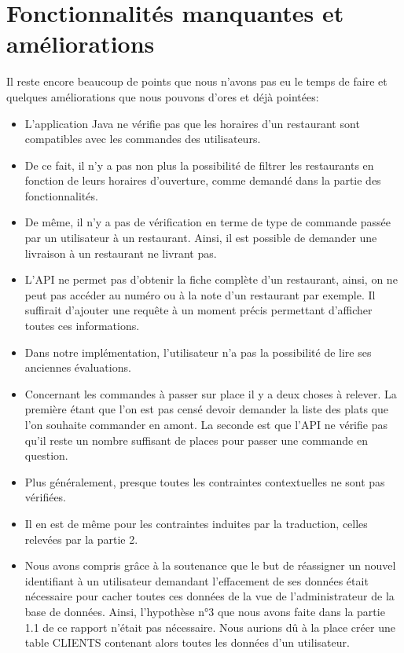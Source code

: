 \documentclass[10pt, a4paper]{article}
\begin{document}
\section{Fonctionnalités manquantes et améliorations}

Il reste encore beaucoup de points que nous n'avons pas eu le temps de faire et quelques améliorations que nous pouvons d'ores et déjà pointées:

\begin{itemize}
    \item L'application Java ne vérifie pas que les horaires d'un restaurant sont compatibles avec les commandes des utilisateurs.
    \item De ce fait, il n'y a pas non plus la possibilité de filtrer les restaurants en fonction de leurs horaires d'ouverture, comme demandé dans la partie des fonctionnalités.
    \item De même, il n'y a pas de vérification en terme de type de commande passée par un utilisateur à un restaurant. Ainsi, il est possible de demander une livraison à un restaurant ne livrant pas.
    \item L'API ne permet pas d'obtenir la fiche complète d'un restaurant, ainsi, on ne peut pas accéder au numéro ou à la note d'un restaurant par exemple. Il suffirait d'ajouter une requête à un moment précis permettant d'afficher toutes ces informations.
    \item Dans notre implémentation, l'utilisateur n'a pas la possibilité de lire ses anciennes évaluations.
    \item Concernant les commandes à passer sur place il y a deux choses à relever. La première étant que l'on est pas censé devoir demander la liste des plats que l'on souhaite commander en amont. La seconde est que l'API ne vérifie pas qu'il reste un nombre suffisant de places pour passer une commande en question.
    \item Plus généralement, presque toutes les contraintes contextuelles ne sont pas vérifiées.
    \item Il en est de même pour les contraintes induites par la traduction, celles relevées par la partie 2.
    \item Nous avons compris grâce à la soutenance que le but de réassigner un nouvel identifiant à un utilisateur demandant l'effacement de ses données était nécessaire pour cacher toutes ces données de la vue de l'administrateur de la base de données. Ainsi, l'hypothèse n°3 que nous avons faite dans la partie 1.1 de ce rapport n'était pas nécessaire. Nous aurions dû à la place créer une table CLIENTS contenant alors toutes les données d'un utilisateur.
\end{itemize}
\end{document}
